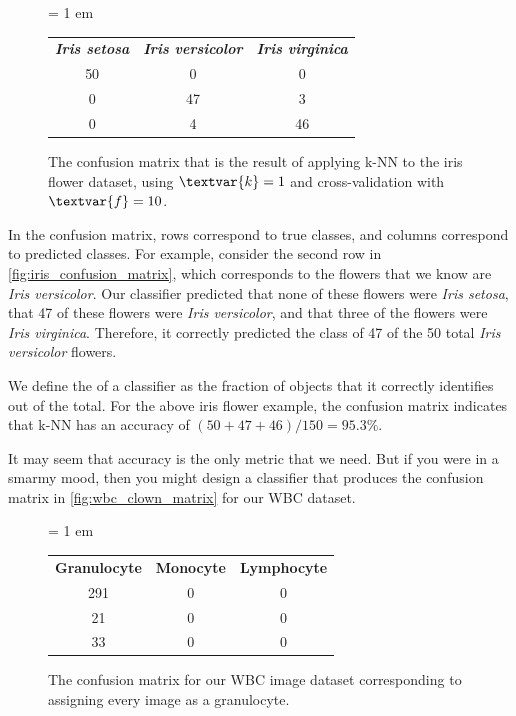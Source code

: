 \begin{figure}[h]
\centering
\tabcolsep = 1 em
\mySfFamily
\begin{tabular}{c c c}
\textbf{\textit{Iris setosa}} & \textbf{\textit{Iris versicolor}} & \textbf{\textit{Iris virginica}} \\
50 & 0 & 0 \\
0 & 47 & 3 \\
0 & 4 & 46
\end{tabular}
\caption{The confusion matrix that is the result of applying k-NN to the iris flower dataset, using $\textvar{k} = \text{1}$ and cross-validation with $\textvar{f} = \text{10}$.}
\label{fig:iris_confusion_matrix}
\end{figure}

In the confusion matrix, rows correspond to true classes, and columns correspond to predicted classes. For example, consider the second row in \autoref{fig:iris_confusion_matrix}, which corresponds to the flowers that we know are \textit{Iris versicolor}. Our classifier predicted that none of these flowers were \textit{Iris setosa}, that 47 of these flowers were \textit{Iris versicolor}, and that three of the flowers were \textit{Iris virginica}. Therefore, it correctly predicted the class of 47 of the 50 total \textit{Iris versicolor} flowers.\\

\begin{note}\end{note}

We define the  of a classifier as the fraction of objects that it correctly identifies out of the total. For the above iris flower example, the confusion matrix indicates that k-NN has an accuracy of $(50 + 47 + 46)/150 = 95.3\%$.

It may seem that accuracy is the only metric that we need. But if you were in a smarmy mood, then you might design a classifier that produces the confusion matrix in \autoref{fig:wbc_clown_matrix} for our WBC dataset.

\begin{figure}[h]
\centering
\tabcolsep = 1 em
\mySfFamily
\begin{tabular}{c c c}
\textbf{Granulocyte} & \textbf{Monocyte} & \textbf{Lymphocyte} \\
291 & 0 & 0 \\
21 & 0 & 0 \\
33 & 0 & 0
\end{tabular}
\caption{The confusion matrix for our WBC image dataset corresponding to assigning every image as a granulocyte.}
\label{fig:wbc_clown_matrix}
\end{figure}

